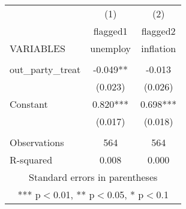 \documentclass[]{article}
\begin{document}
\begin{tabular}{lcc} \hline
 & (1) & (2) \\
 & flagged1 & flagged2 \\
VARIABLES & unemploy & inflation \\ \hline
 &  &  \\
out\_party\_treat & -0.049** & -0.013 \\
 & (0.023) & (0.026) \\
Constant & 0.820*** & 0.698*** \\
 & (0.017) & (0.018) \\
 &  &  \\
Observations & 564 & 564 \\
 R-squared & 0.008 & 0.000 \\ \hline
\multicolumn{3}{c}{ Standard errors in parentheses} \\
\multicolumn{3}{c}{ *** p$<$0.01, ** p$<$0.05, * p$<$0.1} \\
\end{tabular}
\end{document}
